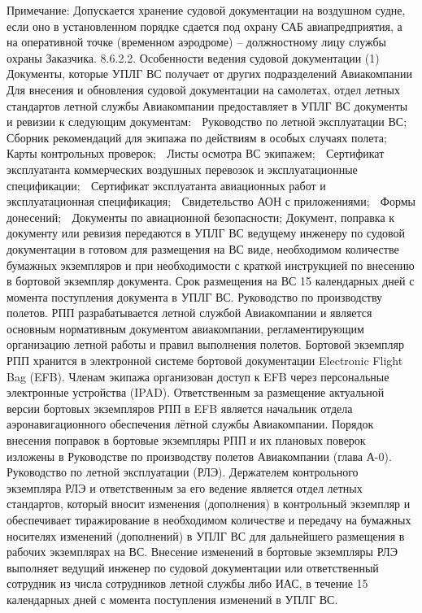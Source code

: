 Примечание: Допускается хранение судовой документации на воздушном судне, если оно в установленном порядке сдается под охрану САБ авиапредприятия, а на оперативной точке (временном аэродроме) – должностному лицу службы охраны Заказчика.
8.6.2.2. Особенности ведения судовой документации
(1) Документы, которые УПЛГ ВС получает от других подразделений Авиакомпании
Для внесения и обновления судовой документации на самолетах, отдел летных стандартов летной службы Авиакомпании предоставляет в УПЛГ ВС документы и ревизии к следующим документам:
	Руководство по летной эксплуатации ВС;
	Сборник рекомендаций для экипажа по действиям в особых случаях полета;
	Карты контрольных проверок; 
	Листы осмотра ВС экипажем;
	Сертификат эксплуатанта коммерческих воздушных перевозок и эксплуатационные спецификации;
	Сертификат эксплуатанта авиационных работ и эксплуатационная спецификация;
	Свидетельство АОН с приложениями;
	Формы донесений;
	Документы по авиационной безопасности;
Документ, поправка к документу или ревизия передаются в УПЛГ ВС ведущему инженеру по судовой документации в готовом для размещения на ВС виде, необходимом количестве бумажных экземпляров и при необходимости с краткой инструкцией по внесению в бортовой экземпляр документа. Срок размещения на ВС 15 календарных дней с момента поступления документа в УПЛГ ВС.
Руководство по производству полетов. 
РПП разрабатывается летной службой Авиакомпании и является основным нормативным документом авиакомпании, регламентирующим организацию летной работы и правил выполнения полетов.
Бортовой экземпляр РПП хранится в электронной системе бортовой документации Electronic Flight Bag (EFB). Членам экипажа организован доступ к EFB через персональные электронные устройства (IPAD). 
Ответственным за размещение актуальной версии бортовых экземпляров РПП в EFB является начальник отдела аэронавигационного обеспечения лётной службы Авиакомпании.
Порядок внесения поправок в бортовые экземпляры РПП и их плановых поверок изложены в Руководстве по производству полетов Авиакомпании (глава А-0).
Руководство по летной эксплуатации (РЛЭ).
Держателем контрольного экземпляра РЛЭ и ответственным за его ведение является отдел летных стандартов, который вносит изменения (дополнения) в контрольный экземпляр и обеспечивает тиражирование в необходимом количестве и передачу на бумажных носителях изменений (дополнений) в УПЛГ ВС для дальнейшего размещения в рабочих экземплярах на ВС.
Внесение изменений в бортовые экземпляры РЛЭ выполняет ведущий инженер по судовой документации или ответственный сотрудник из числа сотрудников летной службы либо ИАС, в течение 15 календарных дней с момента поступления изменений в УПЛГ ВС. 

